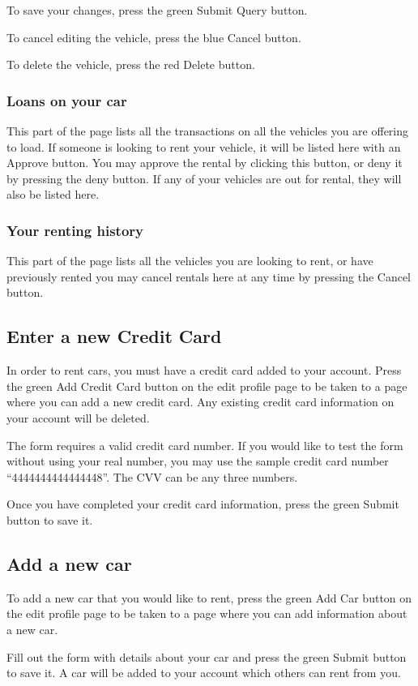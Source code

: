 \documentclass{article}
\begin{document}
To save your changes, press the green Submit Query button.

To cancel editing the vehicle, press the blue Cancel button.

To delete the vehicle, press the red Delete button.

\subsubsection{Loans on your car}
This part of the page lists all the transactions on all the vehicles you are offering to load. If someone is looking to rent your vehicle, it will be listed here with an Approve button. You may approve the rental by clicking this button, or deny it by pressing the deny button. If any of your vehicles are out for rental, they will also be listed here.

\subsubsection{Your renting history}
This part of the page lists all the vehicles you are looking to rent, or have previously rented you may cancel rentals here at any time by pressing the Cancel button.

\subsection{Enter a new Credit Card}
In order to rent cars, you must have a credit card added to your account. Press the green Add Credit Card button on the edit profile page to be taken to a page where you can add a new credit card. Any existing credit card information on your account will be deleted.

The form requires a valid credit card number. If you would like to test the form without using your real number, you may use the sample credit card number ``4444444444444448''. The CVV can be any three numbers.

Once you have completed your credit card information, press the green Submit button to save it.

\subsection{Add a new car}
To add a new car that you would like to rent, press the green Add Car button on the edit profile page to be taken to a page where you can add information about a new car.

Fill out the form with details about your car and press the green Submit button to save it. A car will be added to your account which others can rent from you.
\end{document}
